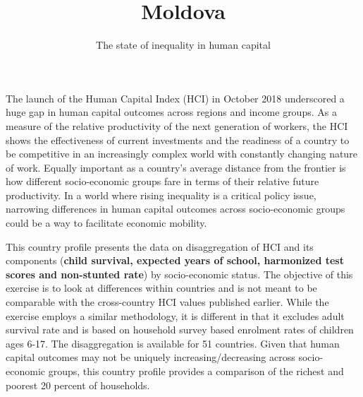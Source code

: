 \documentclass[8pt,]{article}
\title{Moldova}
\author{The state of inequality in human capital}
\date{}
\begin{document}
\maketitle

\newcommand\boldblue[1]{\textcolor{bondiblue}{\textbf{#1}}}

The launch of the Human Capital Index (HCI) in October 2018 underscored
a huge gap in human capital outcomes across regions and income groups.
As a measure of the relative productivity of the next generation of
workers, the HCI shows the effectiveness of current investments and the
readiness of a country to be competitive in an increasingly complex
world with constantly changing nature of work. Equally important as a
country's average distance from the frontier is how different
socio-economic groups fare in terms of their relative future
productivity. In a world where rising inequality is a critical policy
issue, narrowing differences in human capital outcomes across
socio-economic groups could be a way to facilitate economic mobility.

This country profile presents the data on disaggregation of HCI and its
components (\textbf{child survival, expected years of school, harmonized
test scores and non-stunted rate}) by socio-economic status. The
objective of this exercise is to look at differences within countries
and is not meant to be comparable with the cross-country HCI values
published earlier. While the exercise employs a similar methodology, it
is different in that it excludes adult survival rate and is based on
household survey based enrolment rates of children ages 6-17. The
disaggregation is available for 51 countries. Given that human capital
outcomes may not be uniquely increasing/decreasing across socio-economic
groups, this country profile provides a comparison of the richest and
poorest 20 percent of households.
\end{document}
